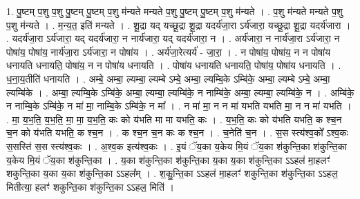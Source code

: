 \documentclass[17pt]{extarticle}
\begin{document}
1. पु॒ष्टम् प॒शु प॒शु पु॒ष्टम् पु॒ष्टम् प॒शु म॑न्यते मन्यते प॒शु पु॒ष्टम् पु॒ष्टम् प॒शु म॑न्यते । . प॒शु म॑न्यते मन्यते प॒शु प॒शु म॑न्यते । . म॒न्य॒त॒ इति॑ मन्यते । . शू॒द्रा यद् यच्छू॒द्रा शू॒द्रा यदर्य॑जा॒रा ऽर्य॑जारा॒ यच्छू॒द्रा शू॒द्रा यदर्य॑जारा । . यदर्य॑जा॒रा ऽर्य॑जारा॒ यद् यदर्य॑जारा॒ न नार्य॑जारा॒ यद् यदर्य॑जारा॒ न । . अर्य॑जारा॒ न नार्य॑जा॒रा ऽर्य॑जारा॒ न पोषा॑य॒ पोषा॑य॒ नार्य॑जा॒रा ऽर्य॑जारा॒ न पोषा॑य । . अर्य॑जा॒रेत्यर्य॑ - जा॒रा॒ । . न पोषा॑य॒ पोषा॑य॒ न न पोषा॑य धनायति धनायति॒ पोषा॑य॒ न न पोषा॑य धनायति । . पोषा॑य धनायति धनायति॒ पोषा॑य॒ पोषा॑य धनायति । . ध॒ना॒य॒तीति॑ धनायति । . अम्बे॒ अम्बा॒ ल्यम्बा॒ ल्यम्बे ऽम्बे॒ अम्बा॒ ल्यम्बि॒के ऽम्बि॑के॒ अम्बा॒ ल्यम्बे ऽम्बे॒ अम्बा॒ ल्यम्बि॑के । . अम्बा॒ ल्यम्बि॒के ऽम्बि॑के॒ अम्बा॒ ल्यम्बा॒ ल्यम्बि॑के॒ न नाम्बि॑के॒ अम्बा॒ ल्यम्बा॒ ल्यम्बि॑के॒ न । . अम्बि॑के॒ न नाम्बि॒के ऽम्बि॑के॒ न मा॑ मा॒ नाम्बि॒के ऽम्बि॑के॒ न मा᳚ । . न मा॑ मा॒ न न मा॑ यभति यभति मा॒ न न मा॑ यभति । . मा॒ य॒भ॒ति॒ य॒भ॒ति॒ मा॒ मा॒ य॒भ॒ति॒ कः को य॑भति मा मा यभति॒ कः । . य॒भ॒ति॒ कः को य॑भति यभति॒ क श्च॒न च॒न को य॑भति यभति॒ क श्च॒न । . क श्च॒न च॒न कः क श्च॒न । . च॒नेति॑ च॒न । . स॒स स्त्य॑श्व॒को᳚ ऽश्व॒कः स॒सस्ति॑ स॒स स्त्य॑श्व॒कः । . अ॒श्व॒क इत्य॑श्व॒कः । . इ॒यं ॅय॒का य॒केय मि॒यं ॅय॒का श॑कुन्ति॒का श॑कुन्ति॒का य॒केय मि॒यं ॅय॒का श॑कुन्ति॒का । . य॒का श॑कुन्ति॒का श॑कुन्ति॒का य॒का य॒का श॑कुन्ति॒का ऽऽहल॑ मा॒हलꣳ॑ शकुन्ति॒का य॒का य॒का श॑कुन्ति॒का ऽऽहल᳚म् । . श॒कु॒न्ति॒का ऽऽहल॑ मा॒हलꣳ॑ शकुन्ति॒का श॑कुन्ति॒का ऽऽहल॒ मितीत्या॒ हलꣳ॑ शकुन्ति॒का श॑कुन्ति॒का ऽऽहल॒ मिति॑ । \newline
\end{document}
